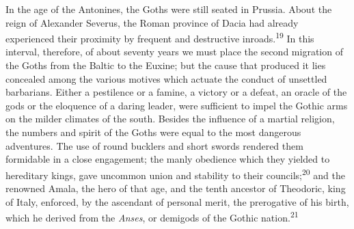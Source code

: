In the age of the Antonines, the Goths were still seated in
Prussia. About the reign of Alexander Severus, the Roman province
of Dacia had already experienced their proximity by frequent and
destructive inroads.\textsuperscript{19} In this interval, therefore, of about
seventy years we must place the second migration of the Goths
from the Baltic to the Euxine; but the cause that produced it
lies concealed among the various motives which actuate the
conduct of unsettled barbarians. Either a pestilence or a famine,
a victory or a defeat, an oracle of the gods or the eloquence of
a daring leader, were sufficient to impel the Gothic arms on the
milder climates of the south. Besides the influence of a martial
religion, the numbers and spirit of the Goths were equal to the
most dangerous adventures. The use of round bucklers and short
swords rendered them formidable in a close engagement; the manly
obedience which they yielded to hereditary kings, gave uncommon
union and stability to their councils;\textsuperscript{20} and the renowned Amala,
the hero of that age, and the tenth ancestor of Theodoric, king
of Italy, enforced, by the ascendant of personal merit, the
prerogative of his birth, which he derived from the \textit{Anses}, or
demigods of the Gothic nation.\textsuperscript{21}




